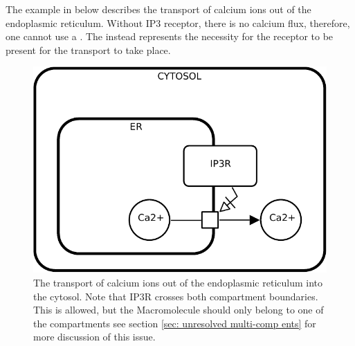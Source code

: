 The example in  below describes the transport of calcium ions out of the endoplasmic reticulum. Without IP3 receptor, there is no calcium flux, therefore, one cannot use a .
The  instead represents the necessity for the receptor to be present for the transport to take place.

\begin{figure}[H]
  \centering
  \includegraphics[scale = 0.8]{images/build/necessary_stim_transport_example.pdf}
  \caption{The transport of calcium ions out of the endoplasmic reticulum into the cytosol. Note that IP3R crosses both compartment boundaries. This is allowed, but the Macromolecule should only belong to one of the compartments see section \ref{sec: unresolved multi-comp ents} for more discussion of this issue.}
  \label{fig:necessary_stim-calcium}
\end{figure}
